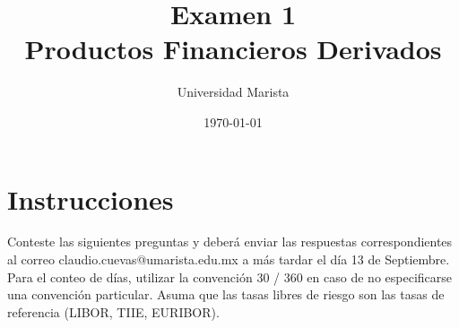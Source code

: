 \documentclass{article}
\title{Examen 1 \\ Productos Financieros Derivados}
\author{Universidad Marista}
\date{\today}
\begin{document}
\maketitle


\section{Instrucciones}
Conteste las siguientes preguntas y deberá enviar las respuestas correspondientes
al correo claudio.cuevas@umarista.edu.mx a más tardar el día 13 de Septiembre. Para el conteo de días, utilizar
la convención 30 / 360 en caso de no especificarse una convención particular. Asuma que las tasas libres de riesgo son las tasas de referencia (LIBOR, TIIE, EURIBOR).


\section*{} 
\end{document}
